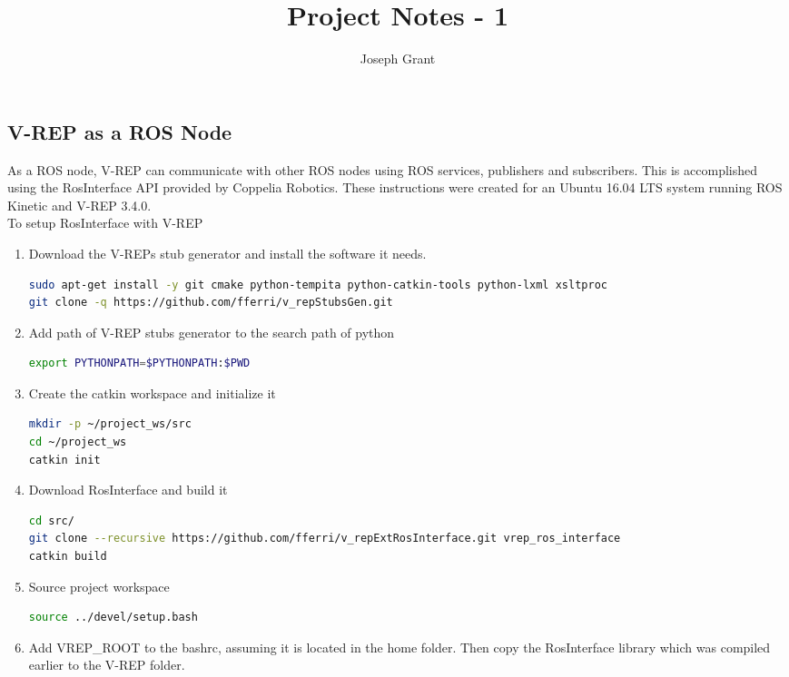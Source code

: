 \documentclass{article}
\begin{document}
\title{Project Notes - 1}
\author{Joseph Grant}
\maketitle


\begin{multicols*}{2}

\section{V-REP as a ROS Node}
\indent \indent As a ROS node, V-REP can communicate with other ROS nodes using ROS services, publishers and subscribers. This is accomplished using the RosInterface API provided by Coppelia Robotics. These instructions were created for an Ubuntu 16.04 LTS system running ROS Kinetic and V-REP 3.4.0. 
\\
\indent To setup RosInterface with V-REP 
\begin{enumerate}
\item Download the V-REPs stub generator and install the software it needs. 
\begin{lstlisting}[language=bash,breaklines=true]
sudo apt-get install -y git cmake python-tempita python-catkin-tools python-lxml xsltproc
git clone -q https://github.com/fferri/v_repStubsGen.git
\end{lstlisting}
\item Add path of V-REP stubs generator to the search path of python 
\begin{lstlisting}[language=bash,breaklines=true]
export PYTHONPATH=$PYTHONPATH:$PWD
\end{lstlisting}
\item Create the catkin workspace and initialize it 
\begin{lstlisting}[language=bash,breaklines=true]
mkdir -p ~/project_ws/src
cd ~/project_ws
catkin init
\end{lstlisting}
\item Download RosInterface and build it 
\begin{lstlisting}[language=bash,breaklines=true]
cd src/
git clone --recursive https://github.com/fferri/v_repExtRosInterface.git vrep_ros_interface
catkin build
\end{lstlisting}
\item Source project workspace
\begin{lstlisting}[language=bash,breaklines=true]
source ../devel/setup.bash
\end{lstlisting}
\item Add VREP\_ROOT to the bashrc, assuming it is located in the home folder. Then copy the RosInterface library which was compiled earlier to the V-REP folder.

\end{enumerate}
\end{multicols*}
\end{document}
